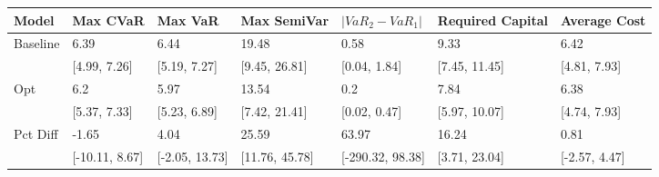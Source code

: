 \begin{tabular}{lllllll}
\toprule
   Model &       Max CVaR &        Max VaR &    Max SemiVar & $|VaR_2 - VaR_1|$ & Required Capital &  Average Cost \\
\midrule
Baseline &           6.39 &           6.44 &          19.48 &              0.58 &             9.33 &          6.42 \\
         &   [4.99, 7.26] &   [5.19, 7.27] &  [9.45, 26.81] &      [0.04, 1.84] &    [7.45, 11.45] &  [4.81, 7.93] \\
     Opt &            6.2 &           5.97 &          13.54 &               0.2 &             7.84 &          6.38 \\
         &   [5.37, 7.33] &   [5.23, 6.89] &  [7.42, 21.41] &      [0.02, 0.47] &    [5.97, 10.07] &  [4.74, 7.93] \\
Pct Diff &          -1.65 &           4.04 &          25.59 &             63.97 &            16.24 &          0.81 \\
         & [-10.11, 8.67] & [-2.05, 13.73] & [11.76, 45.78] &  [-290.32, 98.38] &    [3.71, 23.04] & [-2.57, 4.47] \\
\bottomrule
\end{tabular}

